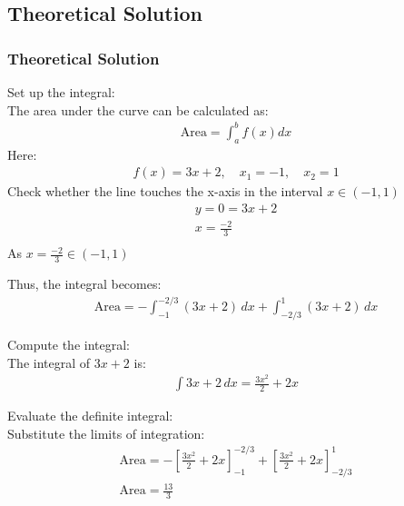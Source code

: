 \documentclass{beamer}
\providecommand{\sbrak}[1]{\ensuremath{{}\left[#1\right]}}
\providecommand{\brak}[1]{\ensuremath{\left(#1\right)}}
\theoremstyle{remark}
\numberwithin{equation}{section}
\begin{document}
\subsection{Theoretical Solution}
\begin{frame}
\frametitle{Theoretical Solution}
    Set up the integral: \\
    The area under the curve can be calculated as:
    \begin{align}
          \text{Area}=\int_{a}^{b}f(x)dx
    \end{align}
     Here:
    \begin{align}
    f(x) = 3x+2, \quad x_1 = -1, \quad x_2 = 1
    \end{align}
    Check whether the line touches the x-axis in the interval $x\in\brak{-1,1}$ \\
    \begin{align}
        y=0=3x+2\\
        x=\frac{-2}{3}\\
    \end{align}
    As $x=\frac{-2}{3}\in \brak{-1,1}$
\end{frame}
\begin{frame}
    Thus, the integral becomes:
    \begin{align}
    \text{Area} = -\int_{-1}^{-2/3} (3x+2)  \, dx+\int_{-2/3}^{1} (3x+2) \, dx
    \end{align}
    \item Compute the integral: \\
    The integral of $3x+2$ is:
    \begin{align}
    \int 3x+2 \, dx = \frac{3x^2}{2}+2x
    \end{align}
    \item Evaluate the definite integral: \\
    Substitute the limits of integration:
    \begin{align}
    \text{Area} = -\sbrak{\frac{3x^2}{2}+2x}_{-1}^{-2/3}+\sbrak{\frac{3x^2}{2}+2x}_{-2/3}^{1} \\
    \text{Area} = \frac{13}{3}
    \end{align}
\end{frame}
\end{document}
